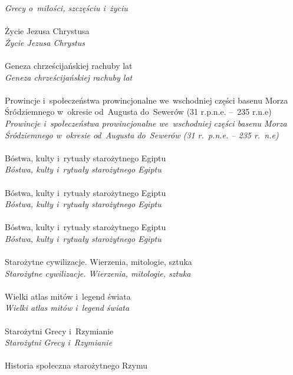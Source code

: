 \documentclass[a4paper,11pt]{article}
\begin{document}
\Powin \textit{Grecy o~miłości, szczęściu i~życiu} \\
 \\
\Jest  Życie Jezusa Chrystusa \\
\Powin \textit{Życie Jezusa Chrystus} \\
 \\
\Jest  Geneza chrześcijańskiej rachuby lat \\
\Powin \textit{Geneza chrześcijańskiej rachuby lat} \\
 \\
\Jest  Prowincje i~społeczeństwa prowincjonalne we~wschodniej części
basenu Morza Śródziemnego w~okresie od~Augusta do~Sewerów
(31 r.p.n.e. --~235 r.n.e) \\
\Powin \textit{Prowincje i~społeczeństwa prowincjonalne we~wschodniej
  części basenu Morza Śródziemnego w~okresie od~Augusta do~Sewerów
  (31 r.~p.n.e. -- 235 r.~n.e)} \\
 \\
\Jest  Bóstwa, kulty i~rytuały starożytnego Egiptu \\
\Powin \textit{Bóstwa, kulty i~rytuały starożytnego Egiptu} \\
 \\
\Jest  Bóstwa, kulty i~rytuały starożytnego Egiptu \\
\Powin \textit{Bóstwa, kulty i~rytuały starożytnego Egiptu} \\
 \\
\Jest  Bóstwa, kulty i~rytuały starożytnego Egiptu \\
\Powin \textit{Bóstwa, kulty i~rytuały starożytnego Egiptu} \\
 \\
\Jest  Starożytne cywilizacje. Wierzenia, mitologie, sztuka \\
\Powin \textit{Starożytne cywilizacje. Wierzenia, mitologie, sztuka} \\
 \\
\Jest  Wielki atlas mitów i~legend świata \\
\Powin \textit{Wielki atlas mitów i~legend świata} \\
 \\
\Jest  Starożytni Grecy i~Rzymianie \\
\Powin \textit{Starożytni Grecy i~Rzymianie} \\
 \\
\Jest  Historia społeczna starożytnego Rzymu \\
\end{document}
